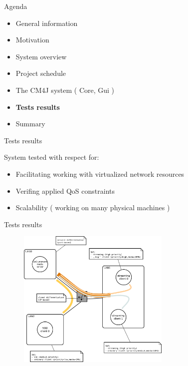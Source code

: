 \documentclass{beamer}
\begin{document}
	\begin{frame}{Agenda}

		\begin{itemize}
			\item General information
			\item Motivation
			\item System overview
			\item Project schedule
			\item The CM4J system ( Core, Gui )
			\item \textbf{Tests results}
			\item Summary
		\end{itemize}

	\end{frame}

	\begin{frame}{Tests results}

		System tested with respect for:
		\begin{itemize}
			\item{Facilitating working with virtualized network resources}\pause
			\item{Verifing applied QoS constraints}\pause
			\item{Scalability ( working on many physical machines )}
		\end{itemize}
	\end{frame}

	\begin{frame}{Tests results}
		
		\begin{figure}
		   \includegraphics[width=0.65\textwidth]{img/diagram.pdf}
		\end{figure}

	\end{frame}
\end{document}
